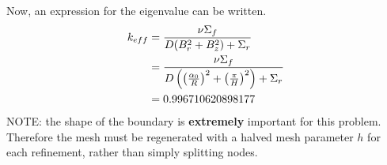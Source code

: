   Now, an expression for the eigenvalue can be written.
  \begin{align}
    k_{eff} &= \frac{\nu \Sigma_f}{D(B_r^2 + B_z^2) + \Sigma_r} \\
    &= \frac{\nu \Sigma_f}{D\left(\left(\frac{\alpha_0}{R}\right)^2 + 
      \left(\frac{\pi}{H}\right)^2 \right) + \Sigma_r} \\
    &= 0.996710620898177
  \end{align}
  NOTE: the shape of the boundary is \textbf{extremely} important for this 
  problem. Therefore the mesh must be regenerated with a halved mesh parameter 
  $h$ for each refinement, rather than simply splitting nodes.
  
